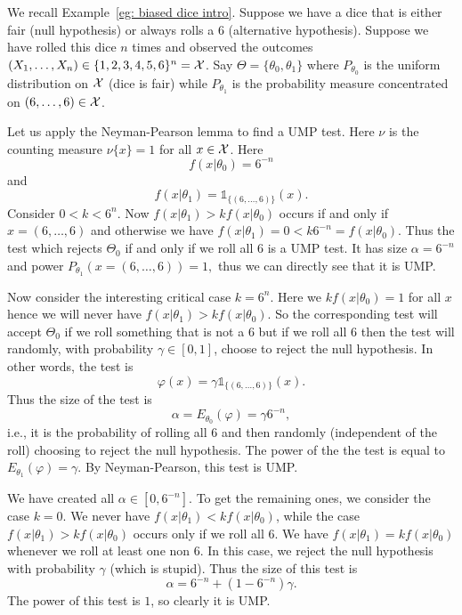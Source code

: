 \documentclass[twoside, a4paper, 10pt]{amsart}
\begin{document}
\begin{eg} We recall Example~\ref{eg: biased dice intro}. Suppose we have a dice that is either fair (null hypothesis) or always rolls a 6 (alternative hypothesis). Suppose we have rolled this dice $n$ times and observed the outcomes $(X_1, \ldots, X_n) \in \{1,2,3,4,5,6\}^n = \mathcal{X}$. Say $\Theta = \{\theta_0, \theta_1\}$ where $P_{\theta_0}$ is the uniform distribution on $\mathcal{X}$ (dice is fair) while $P_{\theta_1}$ is the probability measure concentrated on $(6, \ldots, 6) \in \mathcal{X}$.

Let us apply the Neyman-Pearson lemma to find a UMP test. Here $\nu$ is the counting measure $\nu\{x\} = 1$ for all $x \in \mathcal{X}$. Here $$f(x|\theta_0) = 6^{-n}$$ and $$f(x|\theta_1) = \mathds{1}_{\{(6,\ldots, 6)\}}(x).$$ 
Consider $0<k < 6^{n}$. Now $f(x|\theta_1) > k f(x|\theta_0)$ occurs if and only if $x = (6,\ldots, 6)$ and otherwise we have $f(x|\theta_1) = 0 < k 6^{-n} = f(x|\theta_0)$. Thus the test which rejects $\Theta_0$ if and only if we roll all $6$ is a UMP test. It has size $\alpha = 6^{-n}$ and power $P_{\theta_1}(x = (6,\ldots, 6)) = 1,$ thus we can directly see that it is UMP. 

Now consider the interesting critical case $k = 6^{n}$. Here we $kf(x|\theta_0) = 1$ for all $x$ hence we will never have $f(x|\theta_1) > kf(x|\theta_0)$. So the corresponding test will accept $\Theta_0$ if we roll something that is not a $6$ but if we roll all $6$ then the test will randomly, with probability $\gamma \in [0,1]$, choose to reject the null hypothesis. In other words, the test is $$\varphi(x) = \gamma \mathds{1}_{\{(6,\ldots, 6)\}}(x).$$ Thus the size of the test is $$\alpha = E_{\theta_0}(\varphi) = \gamma 6^{-n},$$ i.e., it is the probability of rolling all $6$ and then randomly (independent of the roll) choosing to reject the null hypothesis. 
The power of the the test is equal to $E_{\theta_1}(\varphi) = \gamma$.
By Neyman-Pearson, this test is UMP.

We have created all $\alpha \in [0,6^{-n}]$. To get the remaining ones, we consider the case $k=0$. We never have $f(x|\theta_1) < kf(x|\theta_0)$, while the case $f(x|\theta_1)>kf(x|\theta_0)$ occurs only if we roll all $6$. We have $f(x|\theta_1) = kf(x|\theta_0)$ whenever we roll at least one non $6$. In this case, we reject the null hypothesis with probability $\gamma$ (which is stupid). Thus the size of this test is $$\alpha = 6^{-n} + (1-6^{-n})\gamma.$$ The power of this test is $1$, so clearly it is UMP.
\end{eg}
\end{document}
